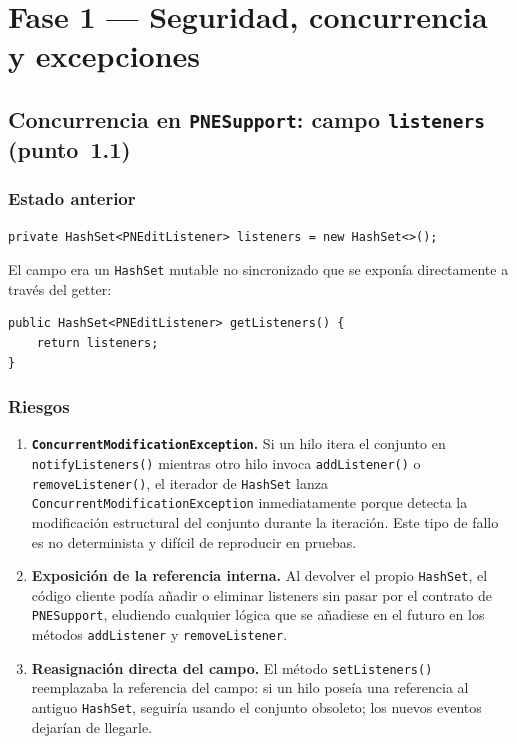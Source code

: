 \documentclass[11pt,a4paper]{article}
\newcommand{\code}[1]{\texttt{#1}}
\begin{document}
\section{Fase 1 --- Seguridad, concurrencia y excepciones}

\subsection{Concurrencia en \code{PNESupport}: campo \code{listeners}
            (punto~1.1)}

\subsubsection*{Estado anterior}

\begin{lstlisting}
private HashSet<PNEditListener> listeners = new HashSet<>();
\end{lstlisting}

El campo era un \code{HashSet} mutable no sincronizado que se exponía
directamente a través del getter:

\begin{lstlisting}
public HashSet<PNEditListener> getListeners() {
    return listeners;
}
\end{lstlisting}

\subsubsection*{Riesgos}

\begin{enumerate}[label=(\alph*)]
  \item \textbf{\code{ConcurrentModificationException}.}
    Si un hilo itera el conjunto en \code{notifyListeners()} mientras
    otro hilo invoca \code{addListener()} o \code{removeListener()},
    el iterador de \code{HashSet} lanza \code{ConcurrentModification\-Exception}
    inmediatamente porque detecta la modificación estructural del conjunto
    durante la iteración. Este tipo de fallo es no determinista y difícil
    de reproducir en pruebas.

  \item \textbf{Exposición de la referencia interna.}
    Al devolver el propio \code{HashSet}, el código cliente podía añadir
    o eliminar listeners sin pasar por el contrato de \code{PNESupport},
    eludiendo cualquier lógica que se añadiese en el futuro en los métodos
    \code{addListener} y \code{removeListener}.

  \item \textbf{Reasignación directa del campo.}
    El método \code{setListeners()} reemplazaba la referencia del campo:
    si un hilo poseía una referencia al antiguo \code{HashSet}, seguiría
    usando el conjunto obsoleto; los nuevos eventos dejarían de llegarle.
\end{enumerate}
\end{document}
